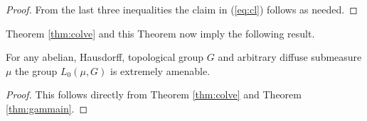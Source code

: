 \begin{proof}
  From the last three inequalities the claim in (\ref{eq:cl}) follows as needed.
\end{proof}

Theorem \ref{thm:colve} and this Theorem now imply the following result.

\begin{thm}
  For any abelian, Hausdorff, topological group $G$ and arbitrary diffuse submeasure $\mu$ the group $L_0(\mu, G)$ is extremely amenable.
\end{thm}

\begin{proof}
  This follows directly from Theorem \ref{thm:colve} and Theorem \ref{thm:gammain}.
\end{proof}
